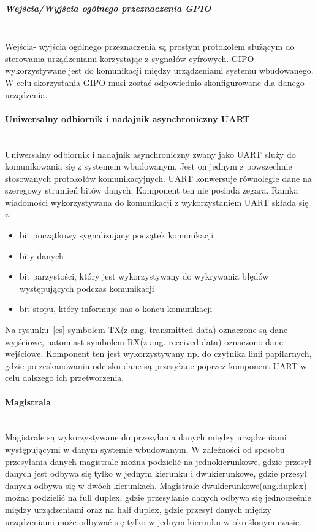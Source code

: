 \documentclass[12p]{article}
\begin{document}
\subparagraph{Wejścia/Wyjścia ogólnego przeznaczenia GPIO} \mbox{} \\

Wejścia- wyjścia ogólnego przeznaczenia są prostym protokołem służącym do sterowania urządzeniami korzystając z sygnałów cyfrowych. GIPO wykorzystywane jest do komunikacji między urządzeniami systemu wbudowanego. W celu skorzystania GIPO musi zostać odpowiednio skonfigurowane dla danego urządzenia.

\paragraph{Uniwersalny odbiornik i nadajnik asynchroniczny UART} \mbox{} \\

Uniwersalny odbiornik i nadajnik asynchroniczny zwany jako UART służy do komunikowania się z systemem wbudowanym. Jest on jednym z powszechnie stosowanych protokołów komunikacyjnych. UART konwersuje równoległe dane na szeregowy strumień bitów danych. Komponent ten nie posiada zegara. Ramka wiadomości wykorzystywana do komunikacji z wykorzystaniem UART składa się z:
\begin{itemize}
\item bit początkowy sygnalizujący początek komunikacji
\item bity danych
\item bit parzystości, który jest wykorzystywany do wykrywania błędów występujących podczas komunikacji
\item bit stopu, który informuje nas o końcu komunikacji
\end{itemize} 

Na rysunku~\ref{es} symbolem TX(z ang. transmitted data) oznaczone są dane wyjściowe, natomiast symbolem RX(z ang. received data) oznaczono dane wejściowe. Komponent ten jest wykorzystywany np. do czytnika linii papilarnych, gdzie po zeskanowaniu odcisku dane są przesyłane poprzez komponent UART w celu dalszego ich przetworzenia.

\paragraph{Magistrala} \mbox{} \\

Magistrale są wykorzystywane do przesyłania danych między urządzeniami występującymi w danym systemie wbudowanym. W zależności od sposobu przesyłania danych magistrale można podzielić na jednokierunkowe, gdzie przesył danych jest odbywa się tylko w jednym kierunku i dwukierunkowe, gdzie przesył danych odbywa się w dwóch kierunkach. Magistrale dwukierunkowe(ang.duplex) można podzielić na full duplex, gdzie przesyłanie danych odbywa się jednocześnie między urządzeniami oraz na half duplex, gdzie przesył danych między urządzeniami może odbywać się tylko w jednym kierunku w określonym czasie.
\end{document}
